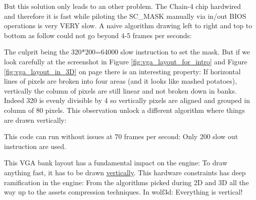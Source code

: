 \documentclass[book.tex]{subfiles}
\begin{document}
\par
But this solution only leads to an other problem. The Chain-4 chip hardwired and therefore it is fast while piloting the SC\_MASK manually via in/out BIOS operations is very VERY slow. A naive algorithm drawing left to right and top to bottom as follow could not go beyond 4-5 frames per seconds:\\
\par
\begin{minipage}{\textwidth}

\end{minipage}
\par
The culprit being the 320*200=64000 slow instruction to set the mask. But if we look carefully at the screenshot in Figure \ref{fig:vga_layout_for_intro} and Figure \ref{fig:vga_layout_in_3D} on page \pageref{fig:vga_layout_in_3D} there is an interesting property: If horizontal lines of pixels are broken into four areas (and it looks like mashed potatoes), vertically the column of pixels are still linear and not broken down in banks. Indeed 320 is evenly divisible by 4 so vertically pixels are aligned and grouped in column of 80 pixels. This observation unlock a different algorithm where things are drawn vertically:\\
\par

\begin{minipage}{\textwidth}

\end{minipage}

\par
This code can run without issues at 70 frames per second: Only 200 slow out instruction are used.\\
\par
This VGA bank layout has a fundamental impact on the engine: To draw anything fast, it has to be drawn \underline{vertically}. This hardware constraints has deep ramification in the engine: From the algorithms picked during 2D and 3D all the way up to the assets compression techniques. In wolf3d: Everything is vertical!\\
\end{document}
